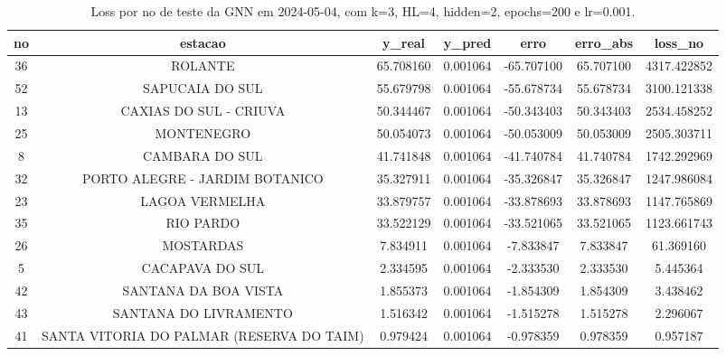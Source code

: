 \begin{table}[h]
\centering
\caption{Loss por no de teste da GNN em 2024-05-04, com k=3, HL=4, hidden=2, epochs=200 e lr=0.001.}
\label{tab:gnn_loss_k3_hl4_h2_e200_d20240504}
\begin{tabular}{ccccccc}
\toprule
no & estacao & y\_real & y\_pred & erro & erro\_abs & loss\_no \\
\midrule
36 & ROLANTE & 65.708160 & 0.001064 & -65.707100 & 65.707100 & 4317.422852 \\
52 & SAPUCAIA DO SUL & 55.679798 & 0.001064 & -55.678734 & 55.678734 & 3100.121338 \\
13 & CAXIAS DO SUL - CRIUVA & 50.344467 & 0.001064 & -50.343403 & 50.343403 & 2534.458252 \\
25 & MONTENEGRO & 50.054073 & 0.001064 & -50.053009 & 50.053009 & 2505.303711 \\
8 & CAMBARA DO SUL & 41.741848 & 0.001064 & -41.740784 & 41.740784 & 1742.292969 \\
32 & PORTO ALEGRE - JARDIM BOTANICO & 35.327911 & 0.001064 & -35.326847 & 35.326847 & 1247.986084 \\
23 & LAGOA VERMELHA & 33.879757 & 0.001064 & -33.878693 & 33.878693 & 1147.765869 \\
35 & RIO PARDO & 33.522129 & 0.001064 & -33.521065 & 33.521065 & 1123.661743 \\
26 & MOSTARDAS & 7.834911 & 0.001064 & -7.833847 & 7.833847 & 61.369160 \\
5 & CACAPAVA DO SUL & 2.334595 & 0.001064 & -2.333530 & 2.333530 & 5.445364 \\
42 & SANTANA DA BOA VISTA & 1.855373 & 0.001064 & -1.854309 & 1.854309 & 3.438462 \\
43 & SANTANA DO LIVRAMENTO & 1.516342 & 0.001064 & -1.515278 & 1.515278 & 2.296067 \\
41 & SANTA VITORIA DO PALMAR (RESERVA DO TAIM) & 0.979424 & 0.001064 & -0.978359 & 0.978359 & 0.957187 \\
\bottomrule
\end{tabular}
\end{table}

